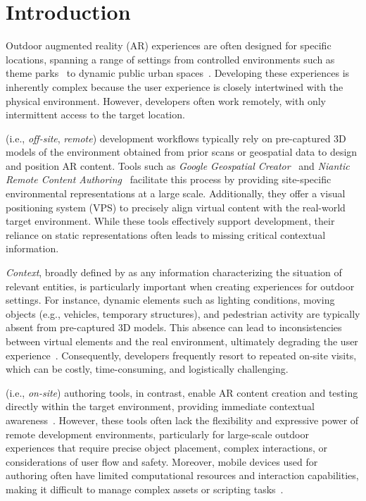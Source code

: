 \section{Introduction}

Outdoor augmented reality (AR) experiences are often designed for specific locations, spanning a range of settings from controlled environments such as theme parks~\cite{LegolandAR2024} to dynamic public urban spaces~\cite{broadcastnow2023}. Developing these experiences is inherently complex because the user experience is closely intertwined with the physical environment. However, developers often work remotely, with only intermittent access to the target location.

\Exsitu (i.e., \emph{off-site}, \emph{remote}) development workflows typically rely on pre-captured 3D models of the environment obtained from prior scans or geospatial data to design and position AR content. Tools such as \textit{Google Geospatial Creator}~\cite{googleGeospatialCreator} and \textit{Niantic Remote Content Authoring}~\cite{lightship-ardk-niantic} facilitate this process by providing site-specific environmental representations at a large scale. Additionally, they offer a visual positioning system (VPS) to precisely align virtual content with the real-world target environment. While these tools effectively support development, their reliance on static representations often leads to missing critical contextual information.

\textit{Context}, broadly defined by \citet{abowdBetterUnderstandingContext1999} as any information characterizing the situation of relevant entities, is particularly important when creating experiences for outdoor settings. For instance, dynamic elements such as lighting conditions, moving objects (e.g., vehicles, temporary structures), and pedestrian activity are typically absent from pre-captured 3D models. This absence can lead to inconsistencies between virtual elements and the real environment, ultimately degrading the user experience~\cite{nebelingXRToolsWhere2022}. Consequently, developers frequently resort to repeated on-site visits, which can be costly, time-consuming, and logistically challenging.

\Insitu (i.e., \emph{on-site}) authoring tools, in contrast, enable AR content creation and testing directly within the target environment, providing immediate contextual awareness~\cite{langlotzSketchingWorldSitu2012,adobeAero,unityMars}. However, these tools often lack the flexibility and expressive power of remote development environments, particularly for large-scale outdoor experiences that require precise object placement, complex interactions, or considerations of user flow and safety. Moreover, mobile devices used for \insitu authoring often have limited computational resources and interaction capabilities, making it difficult to manage complex assets or scripting tasks~\cite{leeImmersiveAuthoringOfTangible2009,vargasgonzalezComparisonDesktopAugmented2019,loOffsiteOnsiteFlexible2021}.

